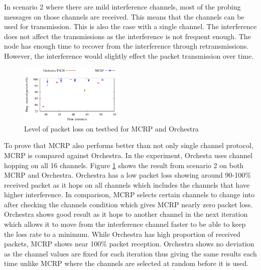 In scenario 2 where there are mild interference channels, most of the probing messages on those channels are received. This means that the channels can be used for transmission. This is also the case with a single channel. The interference does not affect the transmissions as the interference is not frequent enough. The node has enough time to recover from the interference through retransmissions. However, the interference would slightly effect the packet transmission over time. 

\begin{figure}
\centering
\includegraphics[width=0.45\textwidth]{figures/tsch1.pdf}
\caption{Level of packet loss on testbed for MCRP and Orchestra}
\label{fig:orchestra_sim}
\end{figure}

To prove that MCRP also performs better than not only single channel protocol, MCRP is compared against Orchestra. In the experiment, Orchesta uses channel hopping on all 16 channels. Figure \ref{fig:orchestra_sim} shows the result from scenario 2 on both MCRP and Orchestra. Orchestra has a low packet loss showing around 90-100\% received packet as it hops on all channels which includes the channels that have higher interference. In comparison, MCRP selects certain channels to change into after checking the channels condition which gives MCRP nearly zero packet loss. Orchestra shows good result as it hops to another channel in the next iteration which allows it to move from the interference channel faster to be able to keep the loss rate to a minimum. While Orchestra has high proportion of received packets, MCRP shows near 100\% packet reception. Orchestra shows no deviation as the channel values are fixed for each iteration thus giving the same results each time unlike MCRP where the channels are selected at random before it is used.


